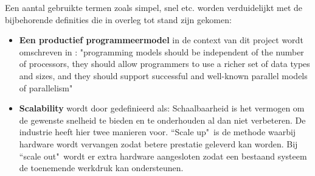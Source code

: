 Een aantal gebruikte termen zoals simpel, snel etc. worden verduidelijkt met de bijbehorende definities die in overleg tot stand zijn gekomen:

\begin{itemize}
    \item \textbf{Een productief programmeermodel} in de context van dit project wordt omschreven in \textcite{asanovic2006landscape}: "programming models should be independent of the number of processors, they should allow programmers to use a richer set of data types and sizes, and they should support successful and well-known parallel models of parallelism"

    \item \textbf{Scalability} wordt door \textcite{dubey2005recognition} gedefinieerd als: Schaalbaarheid is het vermogen om de gewenste snelheid te bieden en te onderhouden al dan niet verbeteren. De industrie heeft hier twee manieren voor. ``Scale up"\ is de methode waarbij hardware wordt vervangen zodat betere prestatie geleverd kan worden. Bij ``scale out"\ wordt er extra hardware aangesloten zodat een bestaand systeem de toenemende werkdruk kan ondersteunen.
\end{itemize}

\begin{comment}
TODO
\begin{itemize}
    \item Data aggregaties moeten plaatsvinden zodra kosten beschikbaar zijn per publisher
    
    \item voor probleem scenario 1 en 4, moet mogelijk zijn om voor een individuele webwinkels de data te aggregeren zodat er correcties kunnen worden gemaakt bij data kwaliteit issues. 
    \item de snelheid waarmee data wordt verwerkt moet snel genoeg zijn om 30 dagen aan data binnen 1 dag te verwerken.
    
    \item De tijd die het kost voor data aggregaties moet voorspelbaar zijn, dit kan worden bereikt wanneer de oplossing lineair schaalbaar is.
\end{itemize}

\end{comment}


